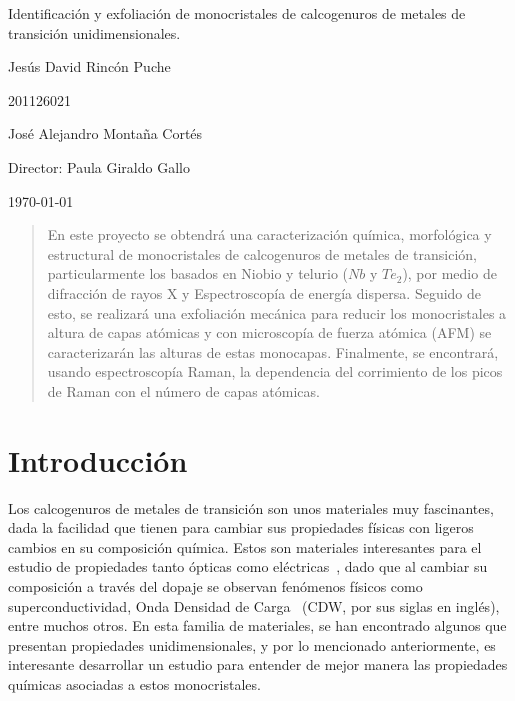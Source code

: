 \documentclass{article}
\begin{document}
\begin{center}
\Huge
Identificación y exfoliación de monocristales de calcogenuros de metales de transición unidimensionales.

\vspace{3mm}
\Large Jesús David Rincón Puche

\large
201126021

\Large José Alejandro Montaña Cortés
\large 


\vspace{2mm}
\Large
Director: Paula Giraldo Gallo\\


\normalsize
\vspace{2mm}

\today
\end{center}

\begin{abstract}

En este proyecto se obtendrá una caracterización química, morfológica y estructural de monocristales de calcogenuros de metales de transición, particularmente los basados en Niobio y telurio ($Nb$ y $Te_2$), por medio de difracción de rayos X y Espectroscopía de energía dispersa. Seguido de esto, se realizará una exfoliación mecánica para reducir los monocristales a altura de capas atómicas y con microscopía de fuerza atómica (AFM) se caracterizarán las alturas de estas monocapas. Finalmente, se encontrará, usando espectroscopía Raman, la dependencia del corrimiento de los picos de Raman con el número de capas atómicas.

\end{abstract}

\normalsize
\section{Introducción}

Los calcogenuros de metales de transición son unos materiales muy fascinantes, dada la facilidad que tienen para cambiar sus propiedades físicas con ligeros cambios en su composición química. Estos son materiales interesantes para el estudio de propiedades tanto ópticas como eléctricas~\cite{dical}, dado que al cambiar su composición a través del dopaje se observan fenómenos físicos como superconductividad, Onda Densidad de Carga~\cite{CDW} (CDW, por sus siglas en inglés), entre muchos otros. En esta familia de materiales, se han encontrado algunos que presentan propiedades unidimensionales, y por lo mencionado anteriormente, es interesante desarrollar un estudio para entender de mejor manera las propiedades químicas asociadas a estos monocristales.\\
\end{document}
